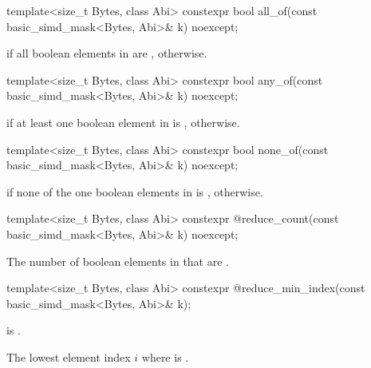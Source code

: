 \begin{itemdecl}
template<size_t Bytes, class Abi>
  constexpr bool all_of(const basic_simd_mask<Bytes, Abi>& k) noexcept;
\end{itemdecl}

\begin{itemdescr}
  \pnum\returns
   if all boolean elements in  are ,  otherwise.
\end{itemdescr}

\begin{itemdecl}
template<size_t Bytes, class Abi>
  constexpr bool any_of(const basic_simd_mask<Bytes, Abi>& k) noexcept;
\end{itemdecl}

\begin{itemdescr}
  \pnum\returns
   if at least one boolean element in  is ,  otherwise.
\end{itemdescr}

\begin{itemdecl}
template<size_t Bytes, class Abi>
  constexpr bool none_of(const basic_simd_mask<Bytes, Abi>& k) noexcept;
\end{itemdecl}

\begin{itemdescr}
  \pnum\returns
   if none of the one boolean elements in  is ,  otherwise.
\end{itemdescr}

\begin{itemdecl}
template<size_t Bytes, class Abi>
  constexpr @\simdsizetype@ reduce_count(const basic_simd_mask<Bytes, Abi>& k) noexcept;
\end{itemdecl}

\begin{itemdescr}
  \pnum\returns
  The number of boolean elements in  that are .
\end{itemdescr}

\begin{itemdecl}
template<size_t Bytes, class Abi>
  constexpr @\simdsizetype@ reduce_min_index(const basic_simd_mask<Bytes, Abi>& k);
\end{itemdecl}

\begin{itemdescr}
  \pnum\expects
   is .

  \pnum\returns
  The lowest element index $i$ where  is .
\end{itemdescr}

